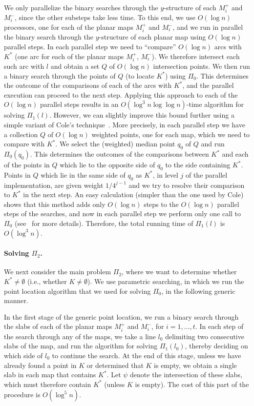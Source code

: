 \documentclass[a4paper,12pt]{article}
\begin{document}
We only parallelize the binary searches through the $y$-structure of
each $M_i^+$ and $M_i^-$, since the other substeps take less time.
To this end, we use $O(\log n)$ processors, one for each of the
planar maps $M_i^+$ and $M_i^-$, and we run in parallel the binary
search through the $y$-structure of each planar map using $O(\log
n)$ parallel steps. In each parallel step we need to ``compare''
$O(\log n)$ arcs with $K^*$ (one arc for each of the planar maps
$M_i^+$, $M_i^-$). We therefore intersect each such arc with $l$ and
obtain a set $Q$ of $O(\log n)$ intersection points. We then run a
binary search through the points of $Q$ (to locate $K^*$) using
$\Pi_0$. This determines the outcome of the comparisons of each of
the arcs with $K^*$, and the parallel execution can proceed to the
next step. Applying this approach to each of the $O(\log n)$
parallel steps results in an $O(\log^3 n \log \log n)$-time
algorithm for solving $\Pi_1(l)$. However, we can slightly improve
this bound further using a simple variant of Cole's
technique~\cite{RC}. More precisely, in each parallel step we have a
collection $Q$ of $O(\log n)$ weighted points, one for each map,
which we need to compare with $K^*$. We select the (weighted) median
point $q_0$ of $Q$ and run $\Pi_0(q_0)$. This determines the
outcomes of the comparisons between $K^*$ and each of the points in
$Q$ which lie to the opposite side of $q_0$ to the side containing
$K^*$. Points in $Q$ which lie in the same side of $q_0$ as $K^*$,
in level $j$ of the parallel implementation, are given weight
$1/4^{j-1}$ and we try to resolve their comparison to $K^*$ in the
next step. An easy calculation (simpler than the one used by Cole)
shows that this method adds only $O(\log n)$ steps to the $O(\log
n)$ parallel steps of the searches, and now in each parallel step we
perform only one call to $\Pi_0$ (see~\cite{RC} for more details).
Therefore, the total running time of $\Pi_1(l)$ is $O(\log^3 n)$.

\paragraph{\bf Solving $\Pi _2$.}
\label{subsec:Pi_2}
We next consider the main problem $\Pi _2$, where we want to
determine whether $K^* \neq \emptyset$ (i.e., whether $K \neq
\emptyset$). We use parametric searching, in which we run the point
location algorithm that we used for solving $\Pi_0$, in the
following generic manner.

In the first stage of the generic point location, we run a binary
search through the slabs of each of the planar maps $M_i^+$ and
$M_i^-$, for $i=1,\ldots,t$. In each step of the search through any
of the maps, we take a line $l_0$ delimiting two consecutive slabs
of the map, and run the algorithm for solving $\Pi _1(l_0)$, thereby
deciding on which side of $l_0$ to continue the search. At the end
of this stage, unless we have already found a point in $K$ or
determined that $K$ is empty, we obtain a single slab in each map
that contains $K^*$.  Let $\psi$ denote the intersection of these
slabs, which must therefore contain $K^*$ (unless $K$ is empty). The
cost of this part of the procedure is $O(\log^5 n)$.
\end{document}
